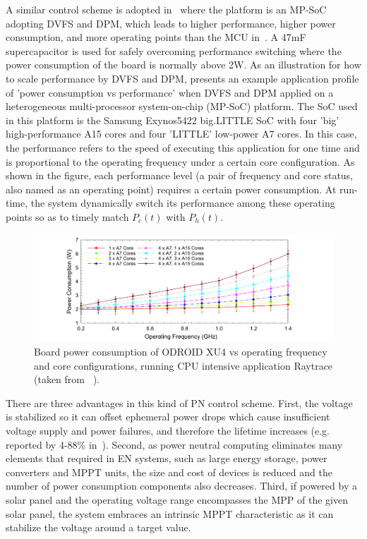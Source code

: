 A similar control scheme is adopted in~\cite{fletcher2017power} where the platform is an MP-SoC adopting DVFS and DPM, which leads to higher performance, higher power consumption, and more operating points than the MCU in~\cite{balsamo2016graceful}. A 47mF supercapacitor is used for safely overcoming performance switching where the power consumption of the board is normally above 2W. As an illustration for how to scale performance by DVFS and DPM,  presents an example application profile of 'power consumption vs performance' when DVFS and DPM applied on a heterogeneous multi-processor system-on-chip (MP-SoC) platform. The SoC used in this platform is the Samsung Exynos5422 big.LITTLE SoC with four 'big' high-performance A15 cores and four 'LITTLE' low-power A7 cores. In this case, the performance refers to the speed of executing this application for one time and is proportional to the operating frequency under a certain core configuration. As shown in the figure, each performance level (a pair of frequency and core status, also named as an operating point) requires a certain power consumption. At run-time, the system dynamically switch its performance among these operating points so as to timely match $P_c(t)$ with $P_h(t)$.

\begin{figure}
    \centering
    \includegraphics[width=\columnwidth]{ch2_review/figures/dvfs}
    \caption{Board power consumption of ODROID XU4 vs operating frequency and core configurations, running CPU intensive application Raytrace (taken from \cite{fletcher2017power}~).}
    \label{Figure:dvfs}
\end{figure}

There are three advantages in this kind of PN control scheme. First, the voltage is stabilized so it can offset ephemeral power drops which cause insufficient voltage supply and power failures, and therefore the lifetime increases (e.g. reported by 4-88\% in~\cite{balsamo2016graceful}). Second, as power neutral computing eliminates many elements that required in EN systems, such as large energy storage, power converters and MPPT units, the size and cost of devices is reduced and the number of power consumption components also decreases. Third, if powered by a solar panel and the operating voltage range encompasses the MPP of the given solar panel, the system embraces an intrinsic MPPT characteristic as it can stabilize the voltage around a target value.

